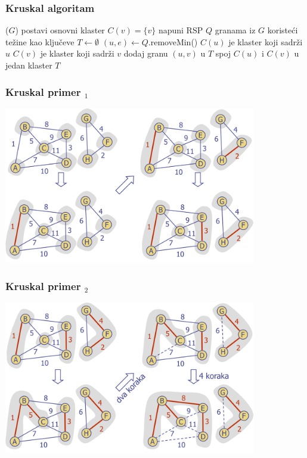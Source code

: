 \documentclass[compress,aspectratio=169]{beamer}
\begin{document}
\begin{frame}[fragile,shrink=2]
  \frametitle{Kruskal algoritam}
  \begin{algorithmic}
    \STATE {}($G$)
      \STATE postavi osnovni klaster $C(v) = \{v\}$
    \ENDFOR
    \STATE napuni RSP $Q$ granama iz $G$ koristeći težine kao ključeve
    \STATE $T \leftarrow \emptyset$
      \STATE $(u,e) \leftarrow Q$.removeMin()
      \STATE $C(u)$ je klaster koji sadrži $u$
      \STATE $C(v)$ je klaster koji sadrži $v$
        \STATE dodaj granu $(u,v)$ u $T$
        \STATE spoj $C(u)$ i $C(v)$ u jedan klaster
      \ENDIF
    \ENDWHILE
    \RETURN $T$
  \end{algorithmic}
\end{frame}

\begin{frame}[fragile]
  \frametitle{Kruskal primer $_1$}
  \begin{center}
    \includegraphics[width=11cm]{asp-14-pic74.png}
  \end{center}
\end{frame}

\begin{frame}[fragile]
  \frametitle{Kruskal primer $_2$}
  \begin{center}
    \includegraphics[width=11cm]{asp-14-pic75.png}
  \end{center}
\end{frame}
\end{document}
